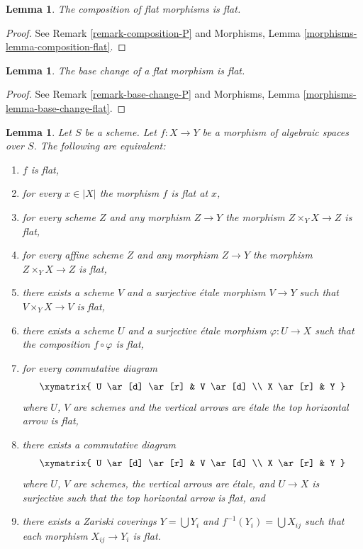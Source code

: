 \documentclass{stacks-project}
\theoremstyle{plain}
\newtheorem{lemma}[subsection]{Lemma}
\theoremstyle{definition}
\theoremstyle{remark}
\numberwithin{equation}{subsection}
\begin{document}
\begin{lemma}
\label{lemma-composition-flat}
The composition of flat morphisms is flat.
\end{lemma}

\begin{proof}
See Remark \ref{remark-composition-P} and
Morphisms, Lemma \ref{morphisms-lemma-composition-flat}.
\end{proof}

\begin{lemma}
\label{lemma-base-change-flat}
The base change of a flat morphism is flat.
\end{lemma}

\begin{proof}
See Remark \ref{remark-base-change-P} and
Morphisms, Lemma \ref{morphisms-lemma-base-change-flat}.
\end{proof}

\begin{lemma}
\label{lemma-flat-local}
Let $S$ be a scheme.
Let $f : X \to Y$ be a morphism of algebraic spaces over $S$.
The following are equivalent:
\begin{enumerate}
\item $f$ is flat,
\item for every $x \in |X|$ the morphism $f$ is flat at $x$,
\item for every scheme $Z$ and any morphism $Z \to Y$ the morphism
$Z \times_Y X \to Z$ is flat,
\item for every affine scheme $Z$ and any morphism
$Z \to Y$ the morphism $Z \times_Y X \to Z$ is flat,
\item there exists a scheme $V$ and a surjective \'etale morphism
$V \to Y$ such that $V \times_Y X \to V$ is flat,
\item there exists a scheme $U$ and a surjective \'etale morphism
$\varphi : U \to X$ such that the composition $f \circ \varphi$
is flat,
\item for every commutative diagram
$$
\xymatrix{
U \ar[d] \ar[r] & V \ar[d] \\
X \ar[r] & Y
}
$$
where $U$, $V$ are schemes and the vertical arrows are \'etale
the top horizontal arrow is flat,
\item there exists a commutative diagram
$$
\xymatrix{
U \ar[d] \ar[r] & V \ar[d] \\
X \ar[r] & Y
}
$$
where $U$, $V$ are schemes, the vertical arrows are \'etale, and
$U \to X$ is surjective such that the top horizontal arrow is flat, and
\item there exists a Zariski coverings $Y = \bigcup Y_i$ and
$f^{-1}(Y_i) = \bigcup X_{ij}$ such that
each morphism $X_{ij} \to Y_i$ is flat.
\end{enumerate}
\end{lemma}
\end{document}
